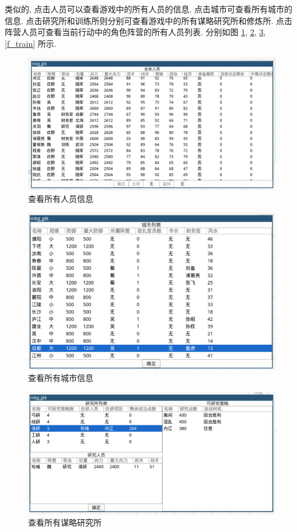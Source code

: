 \documentclass[UTF8, zihao=-4]{ctexart} %
\begin{document}
类似的, 点击人员可以查看游戏中的所有人员的信息. 点击城市可查看所有城市的信息.
点击研究所和训练所则分别可查看游戏中的所有谋略研究所和修炼所. 
点击阵营人员可查看当前行动中的角色阵营的所有人员列表. 分别如图 \ref{f_people}, \ref{f_city},
\ref{f_inst}, \ref{f_train} 所示.
\begin{figure}
    \centering
    \includegraphics[width=\textwidth]{f_people.png}
    \caption{\label{f_people}查看所有人员信息}
\end{figure}
\begin{figure}
    \centering
    \includegraphics[width=\textwidth]{f_city.png}
    \caption{\label{f_city}查看所有城市信息}
\end{figure}
\begin{figure}
    \centering
    \includegraphics[width=\textwidth]{f_inst.png}
    \caption{\label{f_inst}查看所有谋略研究所}
\end{figure}
\end{document}
